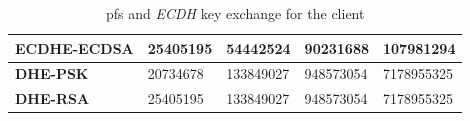 \documentclass{llncs}
\begin{document}
\begin{table}[]
\begin{tabular}{|l|l|l|l|l|}
\textbf{ECDHE-ECDSA}                       & 25405195                        & 54442524                        & 90231688                        & 107981294                        \\ \hline
\textbf{DHE-PSK}                           & 20734678                        & 133849027                       & 948573054                        & 7178955325                        \\ \hline
\textbf{DHE-RSA}                           & 25405195                        & 133849027                        & 948573054                        & 7178955325                        \\ \hline
\end{tabular}
\centering \caption{\label{table:pfs-cost-client} \gls{pfs} and \textit{ECDH} key exchange for the client}
\end{table}
\end{document}
